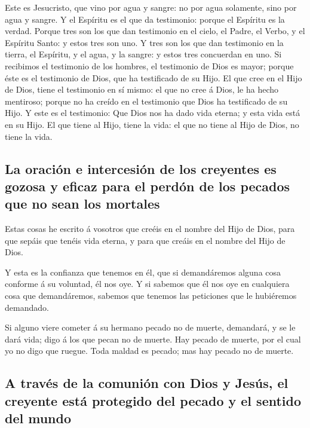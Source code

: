  Este es Jesucristo, que vino por agua y sangre: no por
agua solamente, sino por agua y sangre. Y el Espíritu es el que da
testimonio: porque el Espíritu es la verdad.  Porque tres
son los que dan testimonio en el cielo, el Padre, el Verbo, y el
Espíritu Santo: y estos tres son uno.  Y tres son los que
dan testimonio en la tierra, el Espíritu, y el agua, y la sangre: y
estos tres concuerdan en uno.  Si recibimos el testimonio
de los hombres, el testimonio de Dios es mayor; porque éste es el
testimonio de Dios, que ha testificado de su Hijo.  El
que cree en el Hijo de Dios, tiene el testimonio en sí mismo: el que no
cree á Dios, le ha hecho mentiroso; porque no ha creído en el testimonio
que Dios ha testificado de su Hijo.  Y este es el
testimonio: Que Dios nos ha dado vida eterna; y esta vida está en su
Hijo.  El que tiene al Hijo, tiene la vida: el que no
tiene al Hijo de Dios, no tiene la vida.

\hypertarget{la-oraciuxf3n-e-intercesiuxf3n-de-los-creyentes-es-gozosa-y-eficaz-para-el-perduxf3n-de-los-pecados-que-no-sean-los-mortales}{%
\subsection{La oración e intercesión de los creyentes es gozosa y eficaz
para el perdón de los pecados que no sean los
mortales}\label{la-oraciuxf3n-e-intercesiuxf3n-de-los-creyentes-es-gozosa-y-eficaz-para-el-perduxf3n-de-los-pecados-que-no-sean-los-mortales}}

 Estas cosas he escrito á vosotros que creéis en el
nombre del Hijo de Dios, para que sepáis que tenéis vida eterna, y para
que creáis en el nombre del Hijo de Dios.

 Y esta es la confianza que tenemos en él, que si
demandáremos alguna cosa conforme á su voluntad, él nos oye.
 Y si sabemos que él nos oye en cualquiera cosa que
demandáremos, sabemos que tenemos las peticiones que le hubiéremos
demandado.

 Si alguno viere cometer á su hermano pecado no de
muerte, demandará, y se le dará vida; digo á los que pecan no de muerte.
Hay pecado de muerte, por el cual yo no digo que ruegue. 
Toda maldad es pecado; mas hay pecado no de muerte.

\hypertarget{a-travuxe9s-de-la-comuniuxf3n-con-dios-y-jesuxfas-el-creyente-estuxe1-protegido-del-pecado-y-el-sentido-del-mundo}{%
\subsection{A través de la comunión con Dios y Jesús, el creyente está
protegido del pecado y el sentido del
mundo}\label{a-travuxe9s-de-la-comuniuxf3n-con-dios-y-jesuxfas-el-creyente-estuxe1-protegido-del-pecado-y-el-sentido-del-mundo}}

